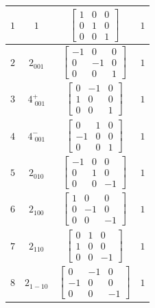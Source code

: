 \documentclass[fleqn,8pt]{jsarticle}
\begin{document}
\begin{longtable}{cccc}
$ 1 $ & $ 1 $ & $ \begin{bmatrix} 1 & 0 & 0 \\ 0 & 1 & 0 \\ 0 & 0 & 1 \end{bmatrix} $ & $ 1 $ \\ \hline
$ 2 $ & $ 2{}_{001} $ & $ \begin{bmatrix} -1 & 0 & 0 \\ 0 & -1 & 0 \\ 0 & 0 & 1 \end{bmatrix} $ & $ 1 $ \\ \hline
$ 3 $ & $ 4^{+}_{\,\,001} $ & $ \begin{bmatrix} 0 & -1 & 0 \\ 1 & 0 & 0 \\ 0 & 0 & 1 \end{bmatrix} $ & $ 1 $ \\ \hline
$ 4 $ & $ 4^{-}_{\,\,001} $ & $ \begin{bmatrix} 0 & 1 & 0 \\ -1 & 0 & 0 \\ 0 & 0 & 1 \end{bmatrix} $ & $ 1 $ \\ \hline
$ 5 $ & $ 2{}_{010} $ & $ \begin{bmatrix} -1 & 0 & 0 \\ 0 & 1 & 0 \\ 0 & 0 & -1 \end{bmatrix} $ & $ 1 $ \\ \hline
$ 6 $ & $ 2{}_{100} $ & $ \begin{bmatrix} 1 & 0 & 0 \\ 0 & -1 & 0 \\ 0 & 0 & -1 \end{bmatrix} $ & $ 1 $ \\ \hline
$ 7 $ & $ 2{}_{110} $ & $ \begin{bmatrix} 0 & 1 & 0 \\ 1 & 0 & 0 \\ 0 & 0 & -1 \end{bmatrix} $ & $ 1 $ \\ \hline
$ 8 $ & $ 2{}_{1-10} $ & $ \begin{bmatrix} 0 & -1 & 0 \\ -1 & 0 & 0 \\ 0 & 0 & -1 \end{bmatrix} $ & $ 1 $ \\
\end{longtable}
\end{document}

